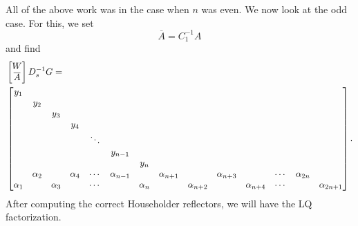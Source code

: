 All of the above work was in the case when $n$ was even. We now look
at the odd case. For this, we set
%
\begin{equation}
    \overline{A} = C_{1}^{-1}A
\end{equation}
%
and find
%
\begin{align}
    \setcounter{MaxMatrixCols}{20}
    &\begin{bmatrix} W \\ \overline{A} \end{bmatrix} D_{s}^{-1}G = \nonumber\\
    &\begin{bmatrix}
        y_{1} & & & & \\
        & y_{2} & & & \\
        & & y_{3} & & \\
        & & & y_{4} & \\
        & & & & \ddots \\
        & & & & & y_{n-1} & & \\
        & & & & & & y_{n} & \\
        & \alpha_{2} & & \alpha_{4} & \cdots & \alpha_{n-1} & & \alpha_{n+1} &
            & \alpha_{n+3} & & \cdots & \alpha_{2n} & \\
        \alpha_{1} & & \alpha_{3} & & \cdots & & \alpha_{n} & &
            \alpha_{n+2} & & \alpha_{n+4} & \cdots & & \alpha_{2n+1} \\
    \end{bmatrix}.
    \label{eq:interp_prob_1_odd}
\end{align}
%
After computing the correct Householder reflectors, we will have the
LQ factorization.




